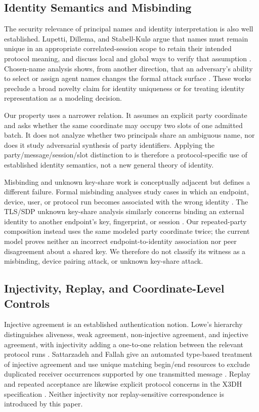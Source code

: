 \subsection{Identity Semantics and Misbinding}

The security relevance of principal names and identity interpretation is also
well established. Lupetti, Dillema, and Stabell-Kul\o{} argue that names must
remain unique in an appropriate correlated-session scope to retain their
intended protocol meaning, and discuss local and global ways to verify that
assumption \cite{lupetti2006names}. Chosen-name analysis shows, from another
direction, that an adversary's ability to select or assign agent names changes
the formal attack surface \cite{ceelen2008chosenname}. These works preclude a
broad novelty claim for identity uniqueness or for treating identity
representation as a modeling decision.

Our property uses a narrower relation. It assumes an explicit party coordinate
and asks whether the same coordinate may occupy two slots of one admitted
batch. It does not analyze whether two principals share an ambiguous name, nor
does it study adversarial synthesis of party identifiers. Applying the
party/message/session/slot distinction to \batchreceive is therefore a
protocol-specific use of established identity semantics, not a new general
theory of identity.

Misbinding and unknown key-share work is conceptually adjacent but defines a
different failure. Formal misbinding analyses study cases in which an endpoint,
device, user, or protocol run becomes associated with the wrong identity
\cite{peltonen2020misbinding}. The TLS/SDP unknown key-share analysis similarly
concerns binding an external identity to another endpoint's key, fingerprint,
or session \cite{thomson2021uks}. Our repeated-party composition instead uses
the same modeled party coordinate twice; the current model proves neither an
incorrect endpoint-to-identity association nor peer disagreement about a
shared key. We therefore do not classify its witness as a misbinding, device
pairing attack, or unknown key-share attack.

\subsection{Injectivity, Replay, and Coordinate-Level Controls}

Injective agreement is an established authentication notion. Lowe's hierarchy
distinguishes aliveness, weak agreement, non-injective agreement, and
injective agreement, with injectivity adding a one-to-one relation between the
relevant protocol runs \cite{lowe1997hierarchy}. Sattarzadeh and Fallah give an
automated type-based treatment of injective agreement and use unique matching
begin/end resources to exclude duplicated receiver occurrences supported by
one transmitted message \cite{sattarzadeh2015injective}. Replay and repeated
acceptance are likewise explicit protocol concerns in the X3DH specification
\cite{marlinspike2016x3dh}. Neither injectivity nor replay-sensitive
correspondence is introduced by this paper.


